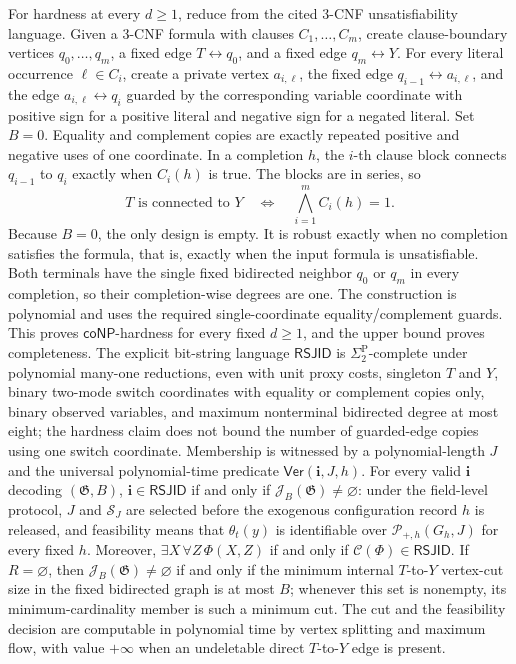 For hardness at every \(d\ge1\), reduce from the cited \(3\)-CNF unsatisfiability language.  Given a \(3\)-CNF formula with clauses \(C_1,\ldots,C_m\), create clause-boundary vertices \(q_0,\ldots,q_m\), a fixed edge \(T\leftrightarrow q_0\), and a fixed edge \(q_m\leftrightarrow Y\).  For every literal occurrence \(\ell\in C_i\), create a private vertex \(a_{i,\ell}\), the fixed edge \(q_{i-1}\leftrightarrow a_{i,\ell}\), and the edge \(a_{i,\ell}\leftrightarrow q_i\) guarded by the corresponding variable coordinate with positive sign for a positive literal and negative sign for a negated literal.  Set \(B=0\).  Equality and complement copies are exactly repeated positive and negative uses of one coordinate.  In a completion \(h\), the \(i\)-th clause block connects \(q_{i-1}\) to \(q_i\) exactly when \(C_i(h)\) is true.  The blocks are in series, so
\[
 T\text{ is connected to }Y
 \quad\Longleftrightarrow\quad
 \bigwedge_{i=1}^m C_i(h)=1.
\]
Because \(B=0\), the only design is empty.  It is robust exactly when no completion satisfies the formula, that is, exactly when the input formula is unsatisfiable.  Both terminals have the single fixed bidirected neighbor \(q_0\) or \(q_m\) in every completion, so their completion-wise degrees are one.  The construction is polynomial and uses the required single-coordinate equality/complement guards.  This proves \(\mathsf{coNP}\)-hardness for every fixed \(d\ge1\), and the upper bound proves completeness.
The explicit bit-string language \(\mathsf{RSJID}\) is \(\Sigma_2^{\mathrm P}\)-complete under polynomial many-one reductions, even with unit proxy costs, singleton \(T\) and \(Y\), binary two-mode switch coordinates with equality or complement copies only, binary observed variables, and maximum nonterminal bidirected degree at most eight; the hardness claim does not bound the number of guarded-edge copies using one switch coordinate. Membership is witnessed by a polynomial-length \(J\) and the universal polynomial-time predicate \(\mathsf{Ver}(\mathbf i,J,h)\). For every valid \(\mathbf i\) decoding \((\mathfrak G,B)\), \(\mathbf i\in\mathsf{RSJID}\) if and only if \(\mathcal J_B(\mathfrak G)\ne\varnothing\): under the field-level protocol, \(J\) and \(\mathcal S_J\) are selected before the exogenous configuration record \(h\) is released, and feasibility means that \(\theta_t(y)\) is identifiable over \(\mathcal P_{+,h}(G_h,J)\) for every fixed \(h\). Moreover, \(\exists X\,\forall Z\,\Phi(X,Z)\) if and only if \(\mathcal C(\Phi)\in\mathsf{RSJID}\).
If \(R=\varnothing\), then \(\mathcal J_B(\mathfrak G)\ne\varnothing\) if and only if the minimum internal \(T\)-to-\(Y\) vertex-cut size in the fixed bidirected graph is at most \(B\); whenever this set is nonempty, its minimum-cardinality member is such a minimum cut. The cut and the feasibility decision are computable in polynomial time by vertex splitting and maximum flow, with value \(+\infty\) when an undeletable direct \(T\)-to-\(Y\) edge is present.

